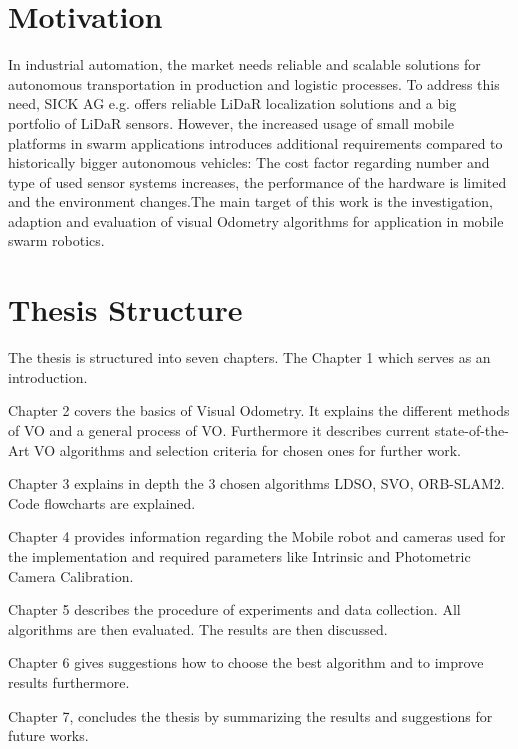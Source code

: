\section{Motivation}
In industrial automation, the market needs reliable and scalable solutions for autonomous transportation in production and logistic processes. To address this need, SICK AG e.g. offers reliable LiDaR localization solutions and a big portfolio of LiDaR sensors. However, the
increased usage of small mobile platforms in swarm applications introduces additional requirements compared to historically bigger autonomous vehicles: The cost factor regarding number and type of used sensor systems increases, the performance of the hardware is limited
and the environment changes.The main target of this work is the investigation, adaption and evaluation of visual Odometry
algorithms for application in mobile swarm robotics.

\section{Thesis Structure}

The thesis is structured into seven chapters. The Chapter 1 which serves as an introduction.

Chapter 2 covers the basics of Visual Odometry. It explains the different methods of VO and a general process of VO. Furthermore it describes current state-of-the-Art VO algorithms and selection criteria for chosen ones for further work.

Chapter 3 explains in depth the 3 chosen algorithms LDSO, SVO, ORB-SLAM2. Code flowcharts are explained.

Chapter 4 provides information regarding the Mobile robot and cameras used for the implementation and required parameters like Intrinsic and Photometric Camera Calibration.

Chapter 5 describes the procedure of experiments and data collection. All algorithms are then evaluated. The results are then discussed.

Chapter 6 gives suggestions how to choose the best algorithm and to improve results furthermore.

Chapter 7, concludes the thesis by summarizing the results and suggestions for future works.